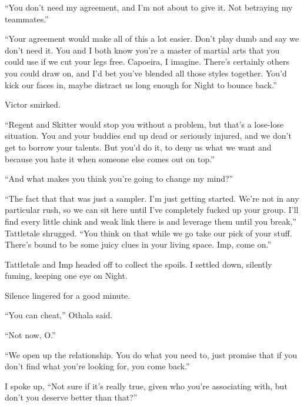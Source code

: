 ``You don't need my agreement, and I'm not about to give it.  Not betraying my teammates.''



``Your agreement would make all of this a lot easier.  Don't play dumb and say we don't need it.  You and I both know you're a master of martial arts that you could use if we cut your legs free.  Capoeira, I imagine.  There's certainly others you could draw on, and I'd bet you've blended all those styles together.  You'd kick our faces in, maybe distract us long enough for Night to bounce back.''



Victor smirked.



``Regent and Skitter would stop you without a problem, but that's a lose-lose situation.  You and your buddies end up dead or seriously injured, and we don't get to borrow your talents.  But you'd do it, to deny us what we want and because you hate it when someone else comes out on top.''



``And what makes you think you're going to change my mind?''



``The fact that that was just a sampler.  I'm just getting started.  We're not in any particular rush, so we can sit here until I've completely fucked up your group.  I'll find every little chink and weak link there is and leverage them until you break,'' Tattletale shrugged.  ``You think on that while we go take our pick of your stuff.  There's bound to be some juicy clues in your living space.  Imp, come on.''



Tattletale and Imp headed off to collect the spoils.  I settled down, silently fuming, keeping one eye on Night.



Silence lingered for a good minute.



``You can cheat,'' Othala said.



``Not now, O.''



``We open up the relationship.  You do what you need to, just promise that if you don't find what you're looking for, you come back.''



I spoke up, ``Not sure if it's really true, given who you're associating with, but don't you deserve better than that?''



